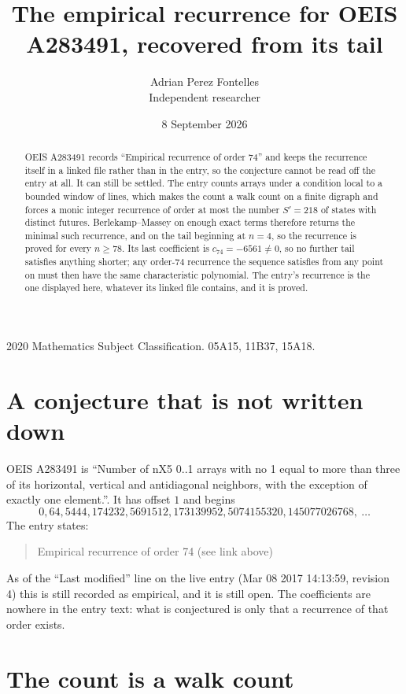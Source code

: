 \documentclass[11pt,a4paper]{article}
\title{The empirical recurrence for OEIS A283491, recovered from its tail}
\author{Adrian Perez Fontelles\\ \small Independent researcher}
\date{8 September 2026}
\theoremstyle{plain}
\theoremstyle{definition}
\begin{document}
\maketitle

\begin{abstract}
OEIS A283491 records ``Empirical recurrence of order $74$'' and keeps the recurrence itself in
a linked file rather than in the entry, so the conjecture cannot be read off the entry at all.
It can still be settled. The entry counts arrays under a condition local to a bounded window of
lines, which makes the count a walk count on a finite digraph and forces a monic integer
recurrence of order at most the number $S'=218$ of states with distinct futures. Berlekamp--Massey on
enough exact terms therefore returns the minimal such recurrence, and on the tail beginning at $n=4$, so the recurrence is proved for every $n\ge78$.
Its last coefficient is $c_{74}=-6561\neq0$, so no further tail satisfies anything
shorter; any order-$74$ recurrence the sequence satisfies from any point on must then have
the same characteristic polynomial. The entry's recurrence is the one displayed here, whatever
its linked file contains, and it is proved.
\end{abstract}

\noindent\small 2020 Mathematics Subject Classification. 05A15, 11B37, 15A18.\normalsize

\section{A conjecture that is not written down}

OEIS A283491 is ``Number of nX5 0..1 arrays with no 1 equal to more than three of its horizontal, vertical and antidiagonal neighbors, with the exception of exactly one element.''. It has offset $1$ and begins
\[
0, 64, 5444, 174232, 5691512, 173139952, 5074155320, 145077026768,\ \dots
\]
The entry states:
\begin{quote}
Empirical recurrence of order 74 (see link above)
\end{quote}
As of the ``Last modified'' line on the live entry (Mar 08 2017 14:13:59, revision 4)
this is still recorded as empirical, and it is still open. The coefficients are nowhere in the
entry text: what is conjectured is only that a recurrence of that order exists.

\section{The count is a walk count}
\end{document}

